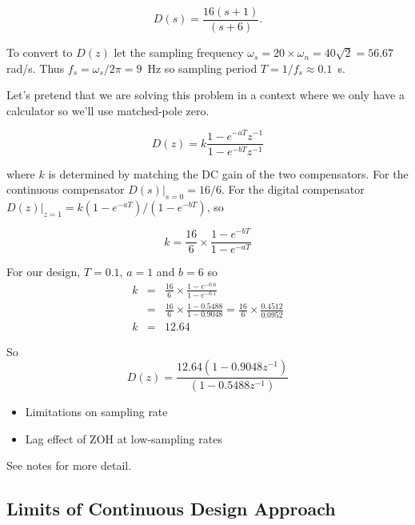 $$D(s) = \frac{16(s+1)}{(s+6)}.$$

To convert to $D(z)$ let the sampling frequency $\omega_s=20\times \omega_n = 40\sqrt{2}=56.67$ rad/s. Thus $f_s=\omega_s/2\pi = 9$~Hz so sampling period $T = 1/f_s \approx 0.1$~s.

Let's pretend that we are solving this problem in a context where we only have a calculator so we'll use matched-pole zero.

$$D(z)=k\frac{1-e^{-aT}z^{-1}}{1-e^{-bT}z^{-1}}$$

where $k$ is determined by matching the DC gain of the two compensators. For the continuous compensator $D(s)|_{s=0} = 16/6$. For the digital compensator $D(z)|_{z=1} = k(1-e^{-aT})/(1-e^{-bT})$, so

$$k=\frac{16}{6}\times\frac{1-e^{-bT}}{1-e^{-aT}}$$

For our design, $T=0.1$, $a=1$ and $b=6$ so
\begin{eqnarray*}
	k & = & \frac{16}{6}\times\frac{1-e^{-0.6}}{1-e^{-0.1}} \\
	&= & \frac{16}{6}\times\frac{1-0.5488}{1-0.9048} = \frac{16}{6}\times\frac{0.4512}{0.0952}  \\
	k & = & 12.64
\end{eqnarray*}

So $$D(z) = \frac{12.64(1-0.9048z^{-1})}{(1-0.5488z^{-1})}$$

\ifslidesonly
\begin{slide}

\end{slide}
\fi


\ifslidesonly
\begin{slide}

\end{slide}
\fi



\ifslidesonly
\begin{slide}
\begin{itemize}
\item Limitations on sampling rate
\item Lag effect of ZOH at low-sampling rates
\end{itemize}
See notes for more detail.
\end{slide}
\fi
\subsection*{Limits of Continuous Design Approach}

